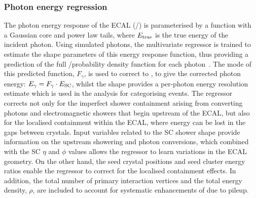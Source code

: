 \subsubsection{Photon energy regression}
The photon energy response of the ECAL (\Etrue/\Eraw) is parameterised by a function with a Gaussian core and power law tails, where $E_{\mathrm{true}}$ is the true energy of the incident photon. Using simulated photons, the multivariate regressor is trained to estimate the shape parameters of this energy response function, thus providing a prediction of the full \Etrue/\Eraw probability density function for each photon~\cite{Khachatryan:2015iwa}. The mode of this predicted function, $F_{\gamma}$, is used to correct \Eraw to \Etrue, to give the corrected photon energy: $E_{\gamma} = F_{\gamma}\cdot E_{\rm{SC}}$, whilst the shape provides a per-photon energy resolution estimate which is used in the \Hgg analysis for categorising events. The regressor corrects not only for the imperfect shower containment arising from converting photons and electromagnetic showers that begin upstream of the ECAL, but also for the localised containment within the ECAL, where energy can be lost in the gaps between crystals. Input variables related to the SC shower shape provide information on the upstream showering and photon conversions, which combined with the SC $\eta$ and $\phi$ values allows the regressor to learn variations in the ECAL geometry. On the other hand, the seed crystal positions and seed cluster energy ratios enable the regressor to correct for the localised containment effects. In addition, the total number of primary interaction vertices and the total energy density, $\rho$, are included to account for systematic enhancements of \Eraw due to pileup. 


